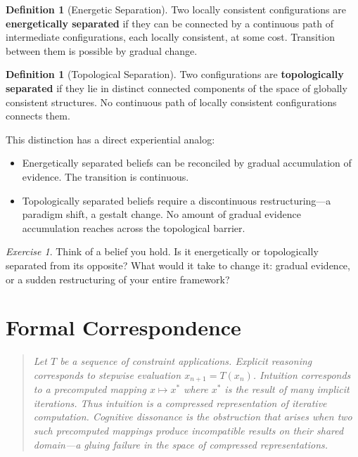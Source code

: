 \documentclass[11pt]{book}
\theoremstyle{plain}
\theoremstyle{definition}
\newtheorem{definition}[theorem]{Definition}
\theoremstyle{remark}
\newtheorem{exercise}[theorem]{Exercise}
\newenvironment{formalcorrespondence}
  {\begin{quote}\small\itshape}
  {\end{quote}}
\begin{document}
\begin{definition}[Energetic Separation]
Two locally consistent configurations are \textbf{energetically separated}
if they can be connected by a continuous path of intermediate configurations,
each locally consistent, at some cost. Transition between them is possible
by gradual change.
\end{definition}

\begin{definition}[Topological Separation]
Two configurations are \textbf{topologically separated} if they lie in
distinct connected components of the space of globally consistent
structures. No continuous path of locally consistent configurations
connects them.
\end{definition}

This distinction has a direct experiential analog:

\begin{itemize}
  \item Energetically separated beliefs can be reconciled by gradual
        accumulation of evidence. The transition is continuous.
  \item Topologically separated beliefs require a discontinuous
        restructuring---a paradigm shift, a gestalt change. No amount of
        gradual evidence accumulation reaches across the topological barrier.
\end{itemize}

\begin{exercise}
Think of a belief you hold. Is it energetically or topologically separated
from its opposite? What would it take to change it: gradual evidence, or a
sudden restructuring of your entire framework?
\end{exercise}

\section*{Formal Correspondence}
\begin{formalcorrespondence}
Let $T$ be a sequence of constraint applications. Explicit reasoning
corresponds to stepwise evaluation $x_{n+1} = T(x_n)$. Intuition
corresponds to a precomputed mapping $x \mapsto x^*$ where $x^*$ is the
result of many implicit iterations. Thus intuition is a compressed
representation of iterative computation. Cognitive dissonance is the
obstruction that arises when two such precomputed mappings produce
incompatible results on their shared domain---a gluing failure in the
space of compressed representations.
\end{formalcorrespondence}
\end{document}
